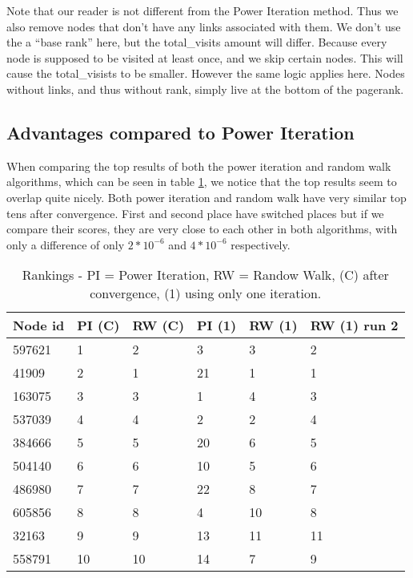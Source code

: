 \documentclass{article}
\begin{document}
Note that our reader is not different from the Power Iteration method. Thus we also remove nodes that don't have any links associated with them. We don't use the a ``base rank'' here, but the total\_visits amount will differ. Because every node is supposed to be visited at least once, and we skip certain nodes. This will cause the total\_visists to be smaller. However the same logic applies here. Nodes without links, and thus without rank, simply live at the bottom of the pagerank. 

\subsection{Advantages compared to  Power Iteration}
When comparing the top results of both the power iteration and random walk algorithms, which can be seen in table \ref{tab:ranks}, we notice that the top results seem to overlap quite nicely.
Both power iteration and random walk have very similar top tens after convergence. 
First and second place have switched places but if we compare their scores, they are very close to each other in both algorithms, with only a difference of only $2 * 10^{-6}$ and $4 * 10^{-6}$ respectively.

\begin{table}[h]
    \centering
    \begin{tabular}{ | p{2cm} | p{1cm} | p{1cm} | p{1cm} | p{1cm} | p{1cm} |}
    \hline
    \textbf{Node id} & PI (C) & RW (C) & PI (1) & RW (1) & RW (1) run 2 \\ \hline
    597621  & 1     & 2     & 3     & 3     & 2     \\ \hline
    41909   & 2     & 1     & 21    & 1     & 1     \\ \hline
    163075  & 3     & 3     & 1     & 4     & 3     \\ \hline
    537039  & 4     & 4     & 2     & 2     & 4     \\ \hline
    384666  & 5     & 5     & 20    & 6     & 5     \\ \hline
    504140  & 6     & 6     & 10    & 5     & 6     \\ \hline
    486980  & 7     & 7     & 22    & 8     & 7     \\ \hline
    605856  & 8     & 8     & 4     & 10    & 8    \\ \hline
    32163   & 9     & 9     & 13    & 11    & 11    \\ \hline
    558791  & 10    & 10    & 14    & 7     & 9     \\ \hline
    \end{tabular}
    \caption{Rankings - PI = Power Iteration, RW = Randow Walk, (C) after convergence, (1) using only one iteration.}
    \label{tab:ranks}
\end{table}
\end{document}
